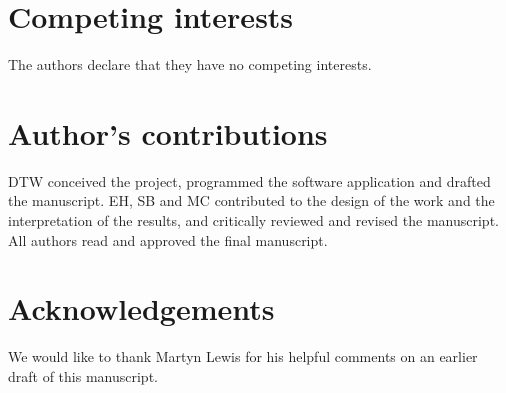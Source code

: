 \documentclass{bmcart}
\begin{document}

\begin{backmatter}

\section*{Competing interests}
  The authors declare that they have no competing interests.

\section*{Author's contributions}

DTW conceived the project, programmed the software application and drafted the manuscript. EH, SB and MC contributed to the design of the work and the interpretation of the results, and critically reviewed and revised the manuscript. All authors read and approved the final manuscript.

\section*{Acknowledgements}
  We would like to thank Martyn Lewis for his helpful comments on an earlier draft of this manuscript.
  



\end{backmatter}
\end{document}
